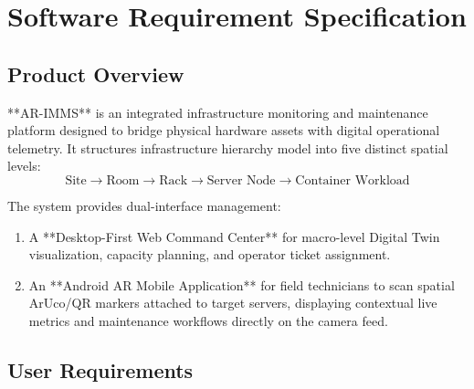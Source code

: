 \chapter{Software Requirement Specification}

\section{Product Overview}
**AR-IMMS** is an integrated infrastructure monitoring and maintenance platform designed to bridge physical hardware assets with digital operational telemetry. It structures infrastructure hierarchy model into five distinct spatial levels:
$$\text{Site} \longrightarrow \text{Room} \longrightarrow \text{Rack} \longrightarrow \text{Server Node} \longrightarrow \text{Container Workload}$$

The system provides dual-interface management:
\begin{enumerate}
    \item A **Desktop-First Web Command Center** for macro-level Digital Twin visualization, capacity planning, and operator ticket assignment.
    \item An **Android AR Mobile Application** for field technicians to scan spatial ArUco/QR markers attached to target servers, displaying contextual live metrics and maintenance workflows directly on the camera feed.
\end{enumerate}

\section{User Requirements}

